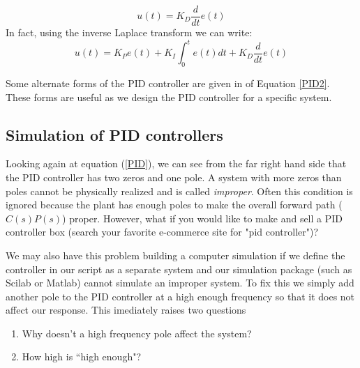 \[
u(t) = K_D \frac{d}{dt}e(t)
\]
In fact, using the inverse Laplace transform we can write:
\[
u(t) = K_P e(t)  + K_I \int_0^t e(t) dt + K_D \frac{d}{dt}e(t)
\]


Some alternate forms of the PID controller are given in of Equation \ref{PID2}.  These forms are useful as we design the PID controller for a specific system.



\subsection{Simulation of PID controllers}\label{simulationPIDcontrollers}

% 
% 


Looking again at equation (\ref{PID}), we can see from the far right hand side that the PID controller has two zeros and one pole.   A system with more zeros than poles cannot be physically realized and is called {\it improper}.   Often this condition is ignored because the plant has enough poles to make the overall forward path ($C(s)P(s)$) proper.  However, what if you would like to make and sell a PID controller box 
(search your favorite e-commerce site for "pid controller")?

We may also have this problem building a computer simulation if we define the controller in our script as a separate system and our simulation package (such as Scilab or Matlab)  cannot simulate an improper system.
To fix this we simply add another pole to the PID controller at a high enough frequency so that it does not affect our response.  This imediately raises two questions




\begin{enumerate}
  \item Why doesn't a high frequency pole affect the system?
  \item How high is ``high enough"?
\end{enumerate}






